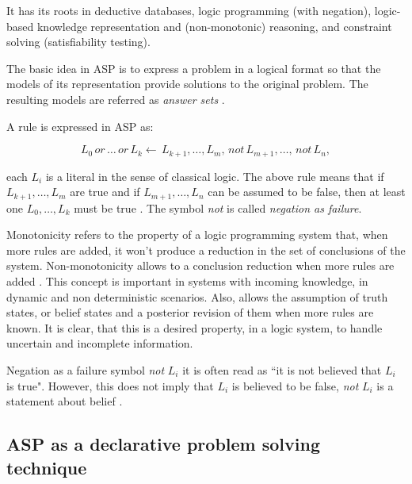 It has its roots in deductive databases, logic programming (with negation), logic-based knowledge representation and (non-monotonic) reasoning, and constraint solving (satisfiability testing).

The basic idea in ASP is to express a problem in a logical format so that the models of its representation provide solutions to the original problem. 
The resulting models are referred as \textit{answer sets} \citep{Gebser2013_ASP}. 



A rule is expressed in ASP as:

\begin{equation*}
L_{0} \, \textit{or} \, \dots \, \textit{or} \, L_{k} \longleftarrow \, L_{k+1} , \ldots , L_{m} , \, \textit{not} \, L_{m+1} , \ldots , \, \textit{not} \, L_{n},
\end{equation*}

each $L_{i}$ is a literal in the sense of classical logic. The above rule means that if $L_{k+1},\ldots,L_{m}$ are true and if $L_{m+1},\ldots,L_{n}$ can be assumed to be false, then at least one $L_{0},\ldots,L_{k}$ must be true \citep{Gelf88a}. The symbol \textit{not} is called \textit{negation as failure}.

Monotonicity refers to the property of a logic programming system that, when more rules are added, it won't produce a reduction in the set of conclusions of the system. 
Non-monotonicity allows to a conclusion reduction when more rules are added \citep{Poole2010_AIbook}. 
This concept is important in systems with incoming knowledge, in dynamic and non deterministic scenarios.
Also, allows the assumption of truth states, or belief states and a posterior revision of them when more rules are known.
It is clear, that this is a desired property, in a logic system, to handle uncertain and incomplete information.

Negation as a failure symbol \textit{not} $L_i$ it is often read as ``it is not believed that $L_i$ is true". 
However, this does not imply that $L_i$ is believed to be false, \textit{not} $L_i$ is a statement about belief \citep{Gelfond2014_KRRbook}.

\subsection{ASP as a declarative problem solving technique}


